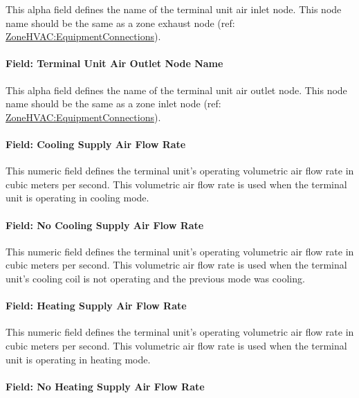 This alpha field defines the name of the terminal unit air inlet node. This node name should be the same as a zone exhaust node (ref: \hyperref[zonehvacequipmentconnections]{ZoneHVAC:EquipmentConnections}).

\paragraph{Field: Terminal Unit Air Outlet Node Name}\label{field-terminal-unit-air-outlet-node-name}

This alpha field defines the name of the terminal unit air outlet node. This node name should be the same as a zone inlet node (ref: \hyperref[zonehvacequipmentconnections]{ZoneHVAC:EquipmentConnections}).

\paragraph{Field: Cooling Supply Air Flow Rate}\label{field-cooling-supply-air-flow-rate-3-001}

This numeric field defines the terminal unit's operating volumetric air flow rate in cubic meters per second. This volumetric air flow rate is used when the terminal unit is operating in cooling mode.

\paragraph{Field: No Cooling Supply Air Flow Rate}\label{field-no-cooling-supply-air-flow-rate-000}

This numeric field defines the terminal unit's operating volumetric air flow rate in cubic meters per second. This volumetric air flow rate is used when the terminal unit's cooling coil is not operating and the previous mode was cooling.

\paragraph{Field: Heating Supply Air Flow Rate}\label{field-heating-supply-air-flow-rate-3-001}

This numeric field defines the terminal unit's operating volumetric air flow rate in cubic meters per second. This volumetric air flow rate is used when the terminal unit is operating in heating mode.

\paragraph{Field: No Heating Supply Air Flow Rate}\label{field-no-heating-supply-air-flow-rate-000}

